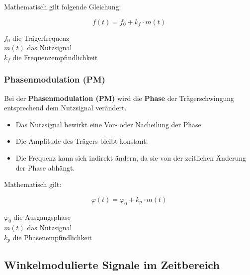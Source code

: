 \documentclass[12pt]{scrartcl}
\begin{document}
Mathematisch gilt folgende Gleichung:

\begin{equation}
   f(t) = f_0 + k_f \cdot m(t) 
\end{equation}
\begin{center}
    $f_0$ die Trägerfrequenz\\
    $m(t)$ das Nutzsignal\\
    $k_f$ die Frequenzempfindlichkeit
\end{center}


\subsubsection{Phasenmodulation (PM)}

Bei der \textbf{Phasenmodulation (PM)} wird die \textbf{Phase} der Trägerschwingung entsprechend dem Nutzsignal verändert.

\begin{itemize}
    \item Das Nutzsignal bewirkt eine Vor- oder Nacheilung der Phase.
    \item Die Amplitude des Trägers bleibt konstant.
    \item Die Frequenz kann sich indirekt ändern, da sie von der zeitlichen Änderung der Phase abhängt.
\end{itemize}

Mathematisch gilt:

\begin{equation}
    \varphi(t) = \varphi_0 + k_p \cdot m(t)    
\end{equation}
\begin{center}
    $\varphi_0$ die Ausgangsphase\\
    $m(t)$ das Nutzsignal\\
    $k_p$ die Phasenempfindlichkeit
\end{center}

\subsection{Winkelmodulierte Signale im Zeitbereich}
\end{document}

